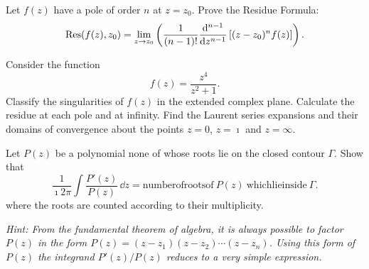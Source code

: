 {\begin{Exercise}
\end{Exercise}













\begin{Exercise}
  \label{exercise residue formula}
  Let $f(z)$ have a pole of order $n$ at $z=z_0$.  Prove the Residue Formula:
  \[
  \mathop{\mathrm{Res}}\nolimits(f(z),z_0) = \lim_{z \to z_0} \left( \frac{1}{(n-1)!}
    \frac{\mathrm{d}^{n-1}}{\mathrm{d} z^{n-1}} \left[ (z-z_0)^n f(z) \right] \right). 
  \]

\end{Exercise}




\begin{Exercise}
  \label{exercise z^4/(z^2+1)}
  Consider the function
  \[
  f(z) = \frac{ z^4 }{ z^2 + 1 }.
  \]
  Classify the singularities of $f(z)$ in the extended complex plane.
  Calculate the residue at each pole and at infinity.
  Find the Laurent series expansions
  and their domains of convergence about the points $z = 0$, $z = \imath$
  and $z = \infty$.

\end{Exercise}







\begin{Exercise}
  \label{exercise P'(z)/P(z)}
  Let $P(z)$ be a polynomial none of whose roots lie on the closed contour 
  $\Gamma$.  Show that 
  \[
  \frac{1}{\imath 2 \pi} \int \frac{P'(z)}{P(z)}\,\dd z = 
  \mathrm{number of roots of}\ P(z)\ \mathrm{which lie inside}\ \Gamma.
  \]
  where the roots are counted according to their multiplicity.

  \textit{Hint:  From the fundamental theorem of algebra,
    it is always possible to factor $P(z)$ in
    the form $P(z) = (z-z_1)(z-z_2)\cdots(z-z_n)$.
    Using this form of $P(z)$ the integrand
    $P'(z)/P(z)$ reduces to a very simple expression.}

\end{Exercise}








}
